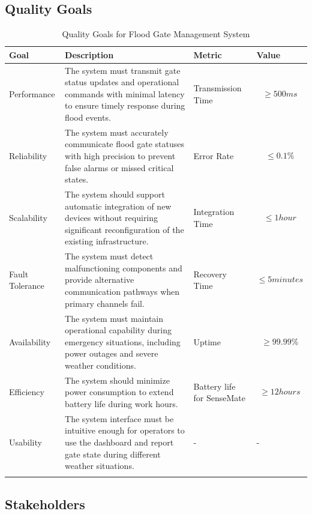 \documentclass[
]{article}
\begin{document}
\hypertarget{_quality_goals}{%
\subsection{Quality Goals}\label{_quality_goals}}
\begin{longtable}[]{@{}
  >{\raggedright\arraybackslash}p{}
  >{\raggedright\arraybackslash}p{}
  >{\raggedright\arraybackslash}p{}
  >{\raggedright\arraybackslash}p{}@{}}
\toprule
\textbf{Goal} & \textbf{Description} & \textbf{Metric} & \textbf{Value} \\
\midrule
\endhead
Performance & The system must transmit gate status updates and operational commands with minimal latency to ensure timely response during flood events. & Transmission Time & \[ \geq 500ms \] \\
Reliability & The system must accurately communicate flood gate statuses with high precision to prevent false alarms or missed critical states. & Error Rate & \[ \leq 0.1\% \] \\
Scalability & The system should support automatic integration of new devices without requiring significant reconfiguration of the existing infrastructure. & Integration Time & \[ \leq 1 hour \] \\
Fault Tolerance & The system must detect malfunctioning components and provide alternative communication pathways when primary channels fail. & Recovery Time & \[ \leq 5 minutes \] \\
Availability & The system must maintain operational capability during emergency situations, including power outages and severe weather conditions. & Uptime & \[ \geq 99.99\% \] \\
Efficiency & The system should minimize power consumption to extend battery life during work hours. & Battery life for SenseMate & \[ \geq 12 hours \] \\
Usability & The system interface must be intuitive enough for operators to use the dashboard and report gate state during different weather situations. & - & - \\
\bottomrule
\caption{Quality Goals for Flood Gate Management System}\\
\end{longtable}

\newpage
\hypertarget{_stakeholders}{%
\subsection{Stakeholders}\label{_stakeholders}}
\end{document}
